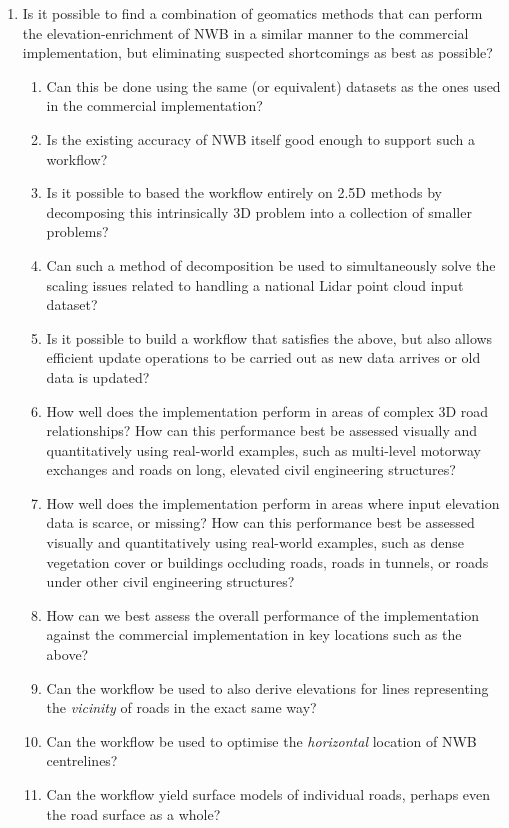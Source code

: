 \begin{enumerate}
    \item Is it possible to find a combination of geomatics methods that can perform the elevation-enrichment of NWB in a similar manner to the commercial implementation, but eliminating suspected shortcomings as best as possible?
    \begin{enumerate}
        \item Can this be done using the same (or equivalent) datasets as the ones used in the commercial implementation?
        \item Is the existing accuracy of NWB itself good enough to support such a workflow?
        \item Is it possible to based the workflow entirely on 2.5D methods by decomposing this intrinsically 3D problem into a collection of smaller problems?
        \item Can such a method of decomposition be used to simultaneously solve the scaling issues related to handling a national Lidar point cloud input dataset?
        \item Is it possible to build a workflow that satisfies the above, but also allows efficient update operations to be carried out as new data arrives or old data is updated?
        \item How well does the implementation perform in areas of complex 3D road relationships? How can this performance best be assessed visually and quantitatively using real-world examples, such as multi-level motorway exchanges and roads on long, elevated civil engineering structures?
        \item How well does the implementation perform in areas where input elevation data is scarce, or missing? How can this performance best be assessed visually and quantitatively using real-world examples, such as dense vegetation cover or buildings occluding roads, roads in tunnels, or roads under other civil engineering structures?
        \item How can we best assess the overall performance of the implementation against the commercial implementation in key locations such as the above?
        \item Can the workflow be used to also derive elevations for lines representing the \textit{vicinity} of roads in the exact same way?
        \item Can the workflow be used to optimise the \textit{horizontal} location of NWB centrelines?
        \item Can the workflow yield surface models of individual roads, perhaps even the road surface as a whole?

\end{enumerate}
\end{enumerate}
